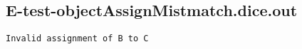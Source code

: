 \subsection{E-test-objectAssignMistmatch.dice.out}
\begin{verbatim}
Invalid assignment of B to C

\end{verbatim}